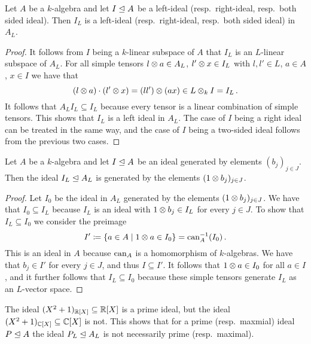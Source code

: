 \begin{lemma}
  Let $A$ be a $k$-algebra and let $I \trianglelefteq A$ be a left-ideal (resp.\ right-ideal, resp.\ both sided ideal).
  Then $I_L$ is a left-ideal (resp.\ right-ideal, resp.\ both sided ideal) in $A_L$.
\end{lemma}
\begin{proof}
  It follows from $I$ being a $k$-linear subspace of $A$ that $I_L$ is an $L$-linear subspace of $A_L$.
  For all simple tensors $l \mathbin{\otimes} a \in A_L$, $l' \mathbin{\otimes} x \in I_L$ with $l, l' \in L$, $a \in A$, $x \in I$ we have that
  \[
        (l \mathbin{\otimes} a) \cdot (l' \mathbin{\otimes} x)
    =   (l l') \mathbin{\otimes} (a x)
    \in L \mathbin{\otimes}_k I
    =   I_L \,.
  \]
  It follows that $A_L I_L \subseteq I_L$ because every tensor is a linear combination of simple tensors.
  This shows that $I_L$ is a left ideal in $A_L$.
  The case of $I$ being a right ideal can be treated in the same way, and the case of $I$ being a two-sided ideal follows from the previous two cases.
\end{proof}


\begin{lemma}
  Let $A$ be a $k$-algebra and let $I \trianglelefteq A$ be an ideal generated by elements $(b_j)_{j \in J}$.
  Then the ideal $I_L \trianglelefteq A_L$ is generated by the elements $(1 \mathbin{\otimes} b_j)_{j \in J}$.
\end{lemma}
\begin{proof}
  Let $I_0$ be the ideal in $A_L$ generated by the elements $(1 \mathbin{\otimes} b_j)_{j \in J}$.
  We have that $I_0 \subseteq I_L$ because $I_L$ is an ideal with $1 \mathbin{\otimes} b_j \in I_L$ for every $j \in J$.
  To show that $I_L \subseteq I_0$ we consider the preimage
  \[
              I'
    \coloneqq \{
                a \in A
              \mid
                1 \mathbin{\otimes} a \in I_0
              \}
    =         \operatorname{can}_A^{-1}(I_0) \,.
  \]
  This is an ideal in $A$ because $\operatorname{can}_A$ is a homomorphism of $k$-algebras.
  We have that $b_j \in I'$ for every $j \in J$, and thus $I \subseteq I'$.
  It follows that $1 \mathbin{\otimes} a \in I_0$ for all $a \in I$, and it further follows that $I_L \subseteq I_0$ because these simple tensors generate $I_L$ as an $L$-vector space.
\end{proof}


\begin{warning}
  The ideal $(X^2+1)_{\mathbb{R}[X]} \subseteq \mathbb{R}[X]$ is a prime ideal, but the ideal \mbox{$(X^2+1)_{\mathbb{C}[X]} \subseteq \mathbb{C}[X]$} is not.
  This shows that for a prime (resp.\ maxmial) ideal $P \trianglelefteq A$ the ideal $P_L \trianglelefteq A_L$ is not necessarily prime (resp.\ maximal).
\end{warning}




